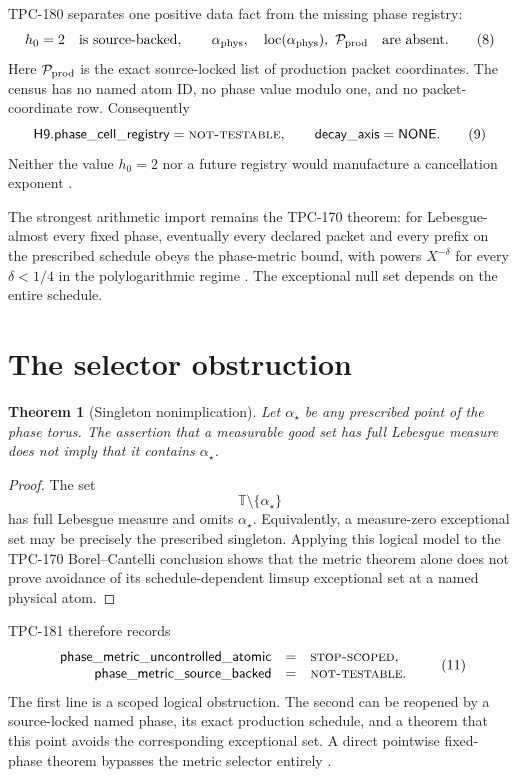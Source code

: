\documentclass[11pt]{article}
\newtheorem{theorem}{Theorem}[section]
\theoremstyle{definition}
\theoremstyle{remark}
\newcommand{\NT}{\textnormal{\textsc{not-testable}}}
\newcommand{\STOP}{\textnormal{\textsc{stop-scoped}}}
\begin{document}
TPC-180 separates one positive data fact from the missing phase
registry:
\[
h_0=2\quad\text{is source-backed},\qquad
\alpha_{\rm phys},\quad
\operatorname{loc}(\alpha_{\rm phys}),\
\mathcal P_{\rm prod}
\quad\text{are absent}.
\tag{8}\label{eq:phase-census}
\]
Here \(\mathcal P_{\rm prod}\) is the exact source-locked list of
production packet coordinates.  The census has no named atom ID, no
phase value modulo one, and no packet-coordinate row.  Consequently
\[
\mathsf{H9.phase\_cell\_registry}=\NT,\qquad
\mathsf{decay\_axis}=\mathsf{NONE}.
\tag{9}\label{eq:phase-registry}
\]
Neither the value \(h_0=2\) nor a future registry would manufacture a
cancellation exponent \citep{WangTPC180}.

The strongest arithmetic import remains the TPC-170 theorem:
for Lebesgue-almost every fixed phase, eventually every declared
packet and every prefix on the prescribed schedule obeys the
phase-metric bound, with powers \(X^{-\delta}\) for every
\(\delta<1/4\) in the polylogarithmic regime
\citep{WangTPC170}.  The exceptional null set depends on the entire
schedule.

\section{The selector obstruction}

\begin{theorem}[Singleton nonimplication]\label{thm:singleton}
Let \(\alpha_\star\) be any prescribed point of the phase torus.
The assertion that a measurable good set has full Lebesgue measure
does not imply that it contains \(\alpha_\star\).
\end{theorem}

\begin{proof}
The set
\[
\mathbb T\setminus\{\alpha_\star\}
\tag{10}\label{eq:singleton}
\]
has full Lebesgue measure and omits \(\alpha_\star\).  Equivalently, a
measure-zero exceptional set may be precisely the prescribed
singleton.  Applying this logical model to the TPC-170
Borel--Cantelli conclusion shows that the metric theorem alone does
not prove avoidance of its schedule-dependent limsup exceptional set
at a named physical atom.
\end{proof}

TPC-181 therefore records
\[
\begin{array}{rcl}
\mathsf{phase\_metric\_uncontrolled\_atomic}
&=&\STOP,\\
\mathsf{phase\_metric\_source\_backed}
&=&\NT.
\end{array}
\tag{11}\label{eq:selector}
\]
The first line is a scoped logical obstruction.  The second can be
reopened by a source-locked named phase, its exact production schedule,
and a theorem that this point avoids the corresponding exceptional
set.  A direct pointwise fixed-phase theorem bypasses the metric
selector entirely \citep{WangTPC181}.
\end{document}
